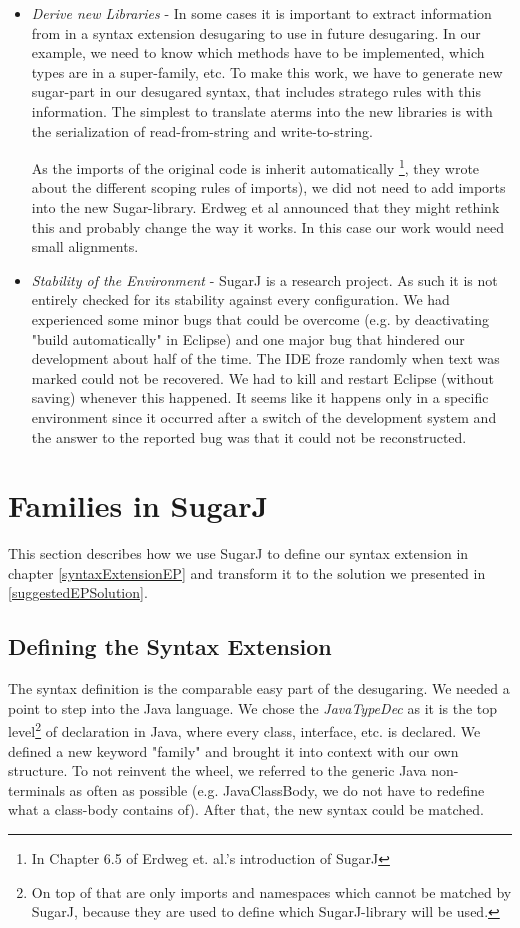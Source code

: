 \documentclass{report}
\begin{document}
\begin{itemize}
\begin{enumerate}
\end{enumerate}
\item \emph{Derive new Libraries} - In some cases it is important to extract information from in a syntax extension desugaring to use in future desugaring. In our example, we need to know which methods have to be implemented, which types are in a super-family, etc. To make this work, we have to generate new sugar-part in our desugared syntax, that includes stratego rules with this information. The simplest to translate aterms into the new libraries is with the serialization of read-from-string and write-to-string.

As the imports of the original code is inherit automatically \footnote{In Chapter 6.5 of Erdweg et. al.'s introduction of SugarJ\cite{Erdweg-SugarJ-2011}}, they wrote about the different scoping rules of imports), we did not need to add imports into the new Sugar-library. Erdweg et al announced that they might rethink this and probably change the way it works. In this case our work would need small alignments.
\item \emph{Stability of the Environment} - SugarJ is a research project. As such it is not entirely checked for its stability against every configuration. We had experienced some minor bugs that could be overcome (e.g. by deactivating "build automatically" in Eclipse) and one major bug that hindered our development about half of the time. The IDE froze randomly when text was marked could not be recovered. We had to kill and restart  Eclipse (without saving) whenever this happened. It seems like it happens only in a specific environment since it occurred after a switch of the development system and the answer to the reported bug was that it could not be reconstructed.
\end{itemize}

\section{Families in SugarJ}

This section describes how we use SugarJ to define our syntax extension in chapter \ref{syntaxExtensionEP} and transform it to the solution we presented in \ref{suggestedEPSolution}.

\subsection{Defining the Syntax Extension}
The syntax definition is the comparable easy part of the desugaring. We needed a point to step into the Java language. We chose the \emph{JavaTypeDec} as it is the top level\footnote{On top of that are only imports and namespaces which cannot be matched by SugarJ, because they are used to define which SugarJ-library will be used.} of declaration in Java, where every class, interface, etc. is declared. We defined a new keyword "family" and brought it into context with our own structure. To not reinvent the wheel, we referred to the generic Java non-terminals as often as possible (e.g. JavaClassBody, we do not have to redefine what a class-body contains of). After that, the new syntax could be matched.
\end{document}
